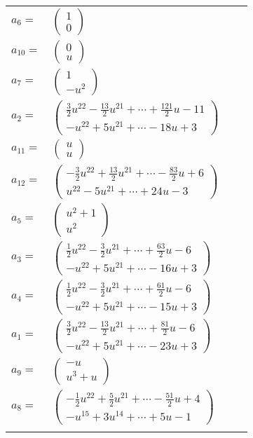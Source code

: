 \documentclass[1p]{elsarticle_modified}
\theoremstyle{definition}
\begin{document}
\begin{tabular}{m{7pt} m{180pt} m{7pt} m{180pt} }
\flushright $a_{6}=$&$\begin{pmatrix}1\\0\end{pmatrix}$ \\
\flushright $a_{10}=$&$\begin{pmatrix}0\\u\end{pmatrix}$ \\
\flushright $a_{7}=$&$\begin{pmatrix}1\\- u^2\end{pmatrix}$ \\
\flushright $a_{2}=$&$\begin{pmatrix}\frac{3}{2} u^{22}-\frac{13}{2} u^{21}+\cdots+\frac{121}{2} u-11\\- u^{22}+5 u^{21}+\cdots-18 u+3\end{pmatrix}$ \\
\flushright $a_{11}=$&$\begin{pmatrix}u\\u\end{pmatrix}$ \\
\flushright $a_{12}=$&$\begin{pmatrix}-\frac{3}{2} u^{22}+\frac{13}{2} u^{21}+\cdots-\frac{83}{2} u+6\\u^{22}-5 u^{21}+\cdots+24 u-3\end{pmatrix}$ \\
\flushright $a_{5}=$&$\begin{pmatrix}u^2+1\\u^2\end{pmatrix}$ \\
\flushright $a_{3}=$&$\begin{pmatrix}\frac{1}{2} u^{22}-\frac{3}{2} u^{21}+\cdots+\frac{63}{2} u-6\\- u^{22}+5 u^{21}+\cdots-16 u+3\end{pmatrix}$ \\
\flushright $a_{4}=$&$\begin{pmatrix}\frac{1}{2} u^{22}-\frac{3}{2} u^{21}+\cdots+\frac{61}{2} u-6\\- u^{22}+5 u^{21}+\cdots-15 u+3\end{pmatrix}$ \\
\flushright $a_{1}=$&$\begin{pmatrix}\frac{3}{2} u^{22}-\frac{13}{2} u^{21}+\cdots+\frac{81}{2} u-6\\- u^{22}+5 u^{21}+\cdots-23 u+3\end{pmatrix}$ \\
\flushright $a_{9}=$&$\begin{pmatrix}- u\\u^3+u\end{pmatrix}$ \\
\flushright $a_{8}=$&$\begin{pmatrix}-\frac{1}{2} u^{22}+\frac{5}{2} u^{21}+\cdots-\frac{51}{2} u+4\\- u^{15}+3 u^{14}+\cdots+5 u-1\end{pmatrix}$\\&\end{tabular}
\end{document}
